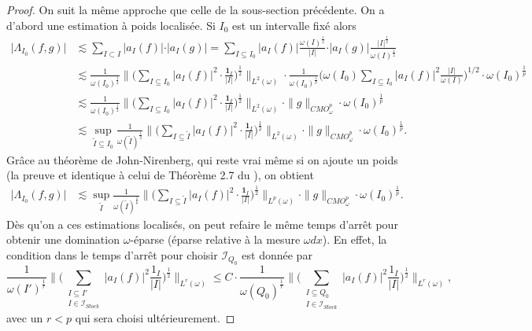 \documentclass[11pt]{amsart}
\newcommand{\one}{\mathbf{1}}
\newcommand{\ii}{\mathscr}
\begin{document}
\begin{proof} On suit la m\^eme approche que celle de la sous-section pr\'ec\'edente. On a d'abord une estimation \`a poids localis\'ee. Si $I_0$ est un intervalle fix\'e alors
\begin{align*}
 \vert \Lambda_{I_0} (f,g) \vert& \lesssim  \sum_{I \subset I} \vert a_I(f)\vert \cdot \vert a_I(g)\vert=\sum_{I \subseteq I_0} \vert a_I(f)\vert \frac{\omega(I)^{\frac{1}{2}}}{\vert I \vert} \cdot \vert a_I(g) \vert \frac{\vert I \vert^{\frac{1}{2}}}{\omega(I)^{\frac{1}{2}}} \\
              &\lesssim \frac{1}{\omega(I_0)^{\frac{1}{2}}} \big\|  \big( \sum_{I \subseteq I_0} \vert a_I(f) \vert^2 \cdot \frac{\one_I}{\vert I \vert}  \big)^{\frac{1}{2}} \big\|_{L^2\left(\omega \right)} \cdot \frac{1}{\omega(I_0)^\frac{1}{p}} \Big(\omega(I_0) \sum_{I \subseteq I_0} \vert a_I(f)\vert^2 \frac{\vert I \vert}{\omega(I)} \Big)^{1/2} \cdot \omega(I_0)^\frac{1}{p}\\
              & \lesssim \frac{1}{\omega(I_0)^{\frac{1}{2}}} \big\|  \big( \sum_{I \subseteq I_0} \vert a_I(f) \vert^2 \cdot \frac{\one_I}{\vert I \vert}  \big)^{\frac{1}{2}} \big\|_{L^2\left(\omega \right)} \cdot \|g\|_{CMO_\omega^p} \cdot \omega(I_0)^{\frac{1}{p}} \\
              &\lesssim \sup_{\tilde I \subseteq I_0} \frac{1}{\omega(\tilde I)^{\frac{1}{2}}} \big\|  \big( \sum_{I \subseteq  \tilde I} \vert a_I(f) \vert^2 \cdot \frac{\one_I}{\vert I \vert}  \big)^{\frac{1}{2}} \big\|_{L^2\left(\omega \right)}  \cdot \|g\|_{CMO_\omega^p}\cdot \omega(I_0)^{\frac{1}{p}}. 
\end{align*}
Gr\^ace au th\'eor\`eme de John-Nirenberg, qui reste vrai m\^eme si on ajoute un poids (la preuve et identique \`a celui de Th\'eor\`eme 2.7 du \cite{multilinear_harmonic}), on obtient
\begin{align*}
 \vert \Lambda_{I_0} (f,g) \vert& \lesssim \sup_{ \tilde I} \frac{1}{\omega(\tilde I)^{\frac{1}{p}}} \big\|  \big( \sum_{I \subseteq \tilde I} \vert a_I(f) \vert^2 \cdot \frac{\one_I}{\vert I \vert}  \big)^{\frac{1}{2}} \big\|_{L^p\left(\omega \right)}  \cdot \|g\|_{CMO_\omega^p}\cdot \omega(I_0)^{\frac{1}{p}}. 
\end{align*}
D\`es qu'on a ces estimations localis\'es, on peut refaire le m\^eme temps d'arr\^et pour obtenir une domination $\omega$-\'eparse (\'eparse relative \`a la mesure $\omega dx$). En effet, la condition dans le temps d'arr\^et pour choisir $\ii I_{Q_0}$ est donn\'ee par
\begin{equation*}
\frac{1}{\omega\left( I' \right)^{\frac{1}{r}}} \big\|  \big( \sum_{\substack{ I \subseteq I' \\ I \in \ii I_{Stock}}} \vert a_I(f) \vert^2  \frac{1_I}{\vert I \vert}   \big)^{\frac{1}{2}} \big\|_{L^r\left(\omega \right)} \leq C \cdot \frac{1}{\omega\left( Q_0\right)^{\frac{1}{r}}} \big\|  \big( \sum_{\substack{ I \subseteq Q_0 \\ I \in \ii I_{Stock}}} \vert a_I(f) \vert^2  \frac{1_I}{\vert I \vert}   \big)^{\frac{1}{2}} \big\|_{L^r\left(\omega \right)},
\end{equation*}
avec un $r<p$ qui sera choisi ult\'erieurement.



\end{proof}
\end{document}
